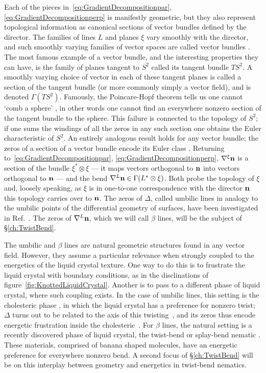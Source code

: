 Each of the pieces in~\eqref{eq:GradientDecompositionpar}, \eqref{eq:GradientDecompositionperp} is manifestly geometric, but they also represent topological information as canonical sections of vector bundles defined by the director. The families of lines $L$ and planes $\xi$ vary smoothly with the director, and such smoothly varying families of vector spaces are called vector bundles \citep{TuBook,MilnorStasheffBook}. The most famous example of a vector bundle, and the interesting properties they can have, is the family of planes tangent to $S^2$ called its tangent bundle $T S^2$. A smoothly varying choice of vector in each of these tangent planes is called a section of the tangent bundle (or more commonly simply a vector field), and is denoted $\Gamma (TS^2)$. Famously, the Poincare-Hopf theorem tells us one cannot `comb a sphere' \citep{Milnor1997}, in other words one cannot find an everywhere nonzero section of the tangent bundle to the sphere. This failure is connected to the topology of $S^2$; if one sums the windings of all the zeros in any such section one obtains the Euler characteristic of $S^2$. An entirely analogous result holds for any vector bundle; the zeros of a section of a vector bundle encode its Euler class \citep{BottTuBook, MilnorStasheffBook}. Returning to~\eqref{eq:GradientDecompositionpar}, \eqref{eq:GradientDecompositionperp}, $\nabla^\xi \bf n $ is a section of the bundle $\xi^* \otimes \xi$ --- it maps vectors orthogonal to $\bf n$ into vectors orthogonal to $\bf n$ --- and the bend $\nabla^L {\bf n} \in \Gamma (L^* \otimes \xi)$. Both probe the topology of $\xi$ and, loosely speaking, as $\xi$ is in one-to-one correspondence with the director $\bf n$ this topology carries over to $\bf n$. The zeros of $\Delta$, called umbilic lines in analogy to the umbilic points of the differential geometry of surfaces, have been investigated in Ref.~\citep{Machon2016b}. The zeros of $\nabla^L \bf n$, which we will call $\beta$ lines, will be the subject of \S\ref{ch:TwistBend}.

The umbilic and $\beta$ lines are natural geometric structures found in any vector field. However, they assume a particular relevance when strongly coupled to the energetics of the liquid crystal texture. One way to do this is to frustrate the liquid crystal with boundary conditions, as in the disclinations of figure~\ref{fig:KnottedLiquidCrystal}. Another is to pass to a different phase of liquid crystal, where such coupling exists. In the case of umbilic lines, this setting is the cholesteric phase \citep{Bellar2014}, in which the liquid crystal has a preference for nonzero twist; $\Delta$ turns out to be related to the axis of this twisting~\citep{MachonThesis, AlexanderBook}, and its zeros thus encode energetic frustration inside the cholesteric~\citep{Machon2016b}. For $\beta$ lines, the natural setting is a recently discovered phase of liquid crystal, the twist-bend or splay-bend nematic \citep{Lavrentovich2018}. These materials, comprised of banana shaped molecules, have an energetic preference for everywhere nonzero bend. A second focus of \S\ref{ch:TwistBend} will be on this interplay between geometry and energetics in twist-bend nematics. 

